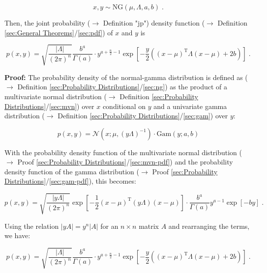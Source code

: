 \documentclass[a4paper,12pt]{book}
\begin{document}
\begin{equation} \label{eq:ng-pdf-ng}
x,y \sim \mathrm{NG}(\mu, \Lambda, a, b) \; .
\end{equation}

Then, the joint probability ($\rightarrow$ Definition "jp") density function ($\rightarrow$ Definition \ref{sec:General Theorems}/\ref{sec:pdf}) of $x$ and $y$ is

\begin{equation} \label{eq:ng-pdf-ng-pdf}
p(x,y) = \sqrt{\frac{|\Lambda|}{(2 \pi)^n}} \frac{b^a}{\Gamma(a)} \cdot y^{a+\frac{n}{2}-1} \exp \left[ -\frac{y}{2} \left( (x-\mu)^\mathrm{T} \Lambda (x-\mu) + 2b \right) \right] \; .
\end{equation}


\vspace{1em}
\textbf{Proof:} The probability density of the normal-gamma distribution is defined as ($\rightarrow$ Definition \ref{sec:Probability Distributions}/\ref{sec:ng}) as the product of a multivariate normal distribution ($\rightarrow$ Definition \ref{sec:Probability Distributions}/\ref{sec:mvn}) over $x$ conditional on $y$ and a univariate gamma distribution ($\rightarrow$ Definition \ref{sec:Probability Distributions}/\ref{sec:gam}) over $y$:

\begin{equation} \label{eq:ng-pdf-ng-pdf-w1}
p(x,y) = \mathcal{N}(x; \mu, (y \Lambda)^{-1}) \cdot \mathrm{Gam}(y; a, b)
\end{equation}

With the probability density function of the multivariate normal distribution ($\rightarrow$ Proof \ref{sec:Probability Distributions}/\ref{sec:mvn-pdf}) and the probability density function of the gamma distribution ($\rightarrow$ Proof \ref{sec:Probability Distributions}/\ref{sec:gam-pdf}), this becomes:

\begin{equation} \label{eq:ng-pdf-ng-pdf-s2}
p(x,y) = \sqrt{\frac{|y \Lambda|}{(2 \pi)^n}} \exp \left[ -\frac{1}{2} (x-\mu)^\mathrm{T} (y \Lambda) (x-\mu) \right] \cdot \frac{b^a}{\Gamma(a)} y^{a-1} \exp\left[-by\right] \; .
\end{equation}

Using the relation $\lvert y A \rvert = y^n \lvert A \rvert$ for an $n \times n$ matrix $A$ and rearranging the terms, we have:

\begin{equation} \label{eq:ng-pdf-ng-pdf-qed}
p(x,y) = \sqrt{\frac{|\Lambda|}{(2 \pi)^n}} \frac{b^a}{\Gamma(a)} \cdot y^{a+\frac{n}{2}-1} \exp \left[ -\frac{y}{2} \left( (x-\mu)^\mathrm{T} \Lambda (x-\mu) + 2b \right) \right] \; .
\end{equation}
\end{document}
